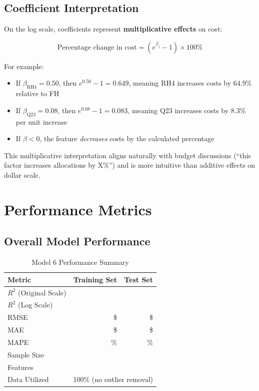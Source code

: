 \subsection{Coefficient Interpretation}

On the log scale, coefficients represent \textbf{multiplicative effects} on cost:

\begin{equation}
\text{Percentage change in cost} = (e^{\beta_j} - 1) \times 100\%
\end{equation}

For example:
\begin{itemize}
    \item If $\beta_{\text{RH4}} = 0.50$, then $e^{0.50} - 1 = 0.649$, meaning RH4 increases costs by 64.9\% relative to FH
    \item If $\beta_{\text{Q23}} = 0.08$, then $e^{0.08} - 1 = 0.083$, meaning Q23 increases costs by 8.3\% per unit increase
    \item If $\beta < 0$, the feature \textit{decreases} costs by the calculated percentage
\end{itemize}

This multiplicative interpretation aligns naturally with budget discussions (``this factor increases allocations by X\%'') and is more intuitive than additive effects on dollar scale.

\section{Performance Metrics}

\subsection{Overall Model Performance}

\begin{table}[h]
\centering
\caption{Model 6 Performance Summary}
\begin{tabular}{lrr}
\toprule
\textbf{Metric} & \textbf{Training Set} & \textbf{Test Set} \\
\midrule
$R^2$ (Original Scale) & \ModelSixRSquaredTrain{} & \ModelSixRSquaredTest{} \\
$R^2$ (Log Scale) & \multicolumn{2}{c}{\ModelSixRSquaredLogScale{}} \\
RMSE & \$\ModelSixRMSETrain{} & \$\ModelSixRMSETest{} \\
MAE & \$\ModelSixMAETrain{} & \$\ModelSixMAETest{} \\
MAPE & \ModelSixMAPETrain{}\% & \ModelSixMAPETest{}\% \\
Sample Size & \ModelSixTrainingSamples{} & \ModelSixTestSamples{} \\
\midrule
Features & \multicolumn{2}{c}{\ModelSixNumFeatures{}} \\
Data Utilized & \multicolumn{2}{c}{100\% (no outlier removal)} \\
\bottomrule
\end{tabular}
\end{table}

